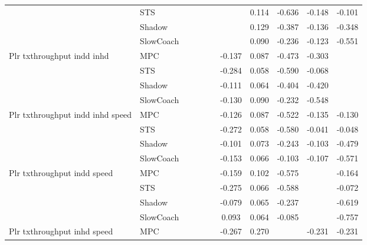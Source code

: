 \begin{tabular}{|l|l|*{9}{c|}}
                              & STS &       &        &        &     &     &  0.114 &  -0.636 &  -0.148 &   -0.101 \\
                              & Shadow &       &        &        &     &     &  0.129 &  -0.387 &  -0.136 &   -0.348 \\
                              & SlowCoach &       &        &        &     &     &  0.090 &  -0.236 &  -0.123 &   -0.551 \\
\midrule
Plr txthroughput indd inhd    & MPC &       &        &        &     & -0.137 &  0.087 &  -0.473 &  -0.303 &       \\
                              & STS &       &        &        &     & -0.284 &  0.058 &  -0.590 &  -0.068 &       \\
                              & Shadow &       &        &        &     & -0.111 &  0.064 &  -0.404 &  -0.420 &       \\
                              & SlowCoach &       &        &        &     & -0.130 &  0.090 &  -0.232 &  -0.548 &       \\
\midrule
Plr txthroughput indd inhd speed    & MPC &       &        &        &     & -0.126 &  0.087 &  -0.522 &  -0.135 &   -0.130 \\
                              & STS &       &        &        &     & -0.272 &  0.058 &  -0.580 &  -0.041 &   -0.048 \\
                              & Shadow &       &        &        &     & -0.101 &  0.073 &  -0.243 &  -0.103 &   -0.479 \\
                              & SlowCoach &       &        &        &     & -0.153 &  0.066 &  -0.103 &  -0.107 &   -0.571 \\
\midrule
Plr txthroughput indd speed    & MPC &       &        &        &     & -0.159 &  0.102 &  -0.575 &      &   -0.164 \\
                              & STS &       &        &        &     & -0.275 &  0.066 &  -0.588 &      &   -0.072 \\
                              & Shadow &       &        &        &     & -0.079 &  0.065 &  -0.237 &      &   -0.619 \\
                              & SlowCoach &       &        &        &     &  0.093 &  0.064 &  -0.085 &      &   -0.757 \\
\midrule
Plr txthroughput inhd speed    & MPC &       &        &        &     & -0.267 &  0.270 &      &  -0.231 &   -0.231 \\

\end{tabular}
